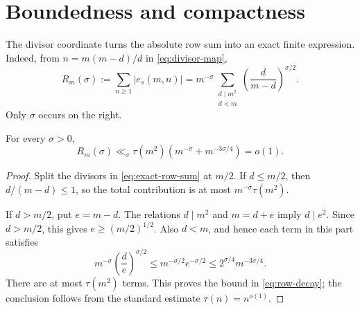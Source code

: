 \section{Boundedness and compactness}
\label{sec:bounded-compact}

The divisor coordinate turns the absolute row sum into an exact finite
expression.  Indeed, from
$n=m(m-d)/d$ in \eqref{eq:divisor-map},
\begin{equation}
 R_m(\sigma):=\sum_{n\geq1}|e_s(m,n)|
 =m^{-\sigma}
  \sum_{\substack{d\mid m^2\\d<m}}
  (\frac{d}{m-d})^{\sigma/2}.
 \label{eq:exact-row-sum}
\end{equation}
Only $\sigma$ occurs on the right.

\begin{proposition}
\label{prop:vanishing-rows}
For every $\sigma>0$,
\begin{equation}
 R_m(\sigma)
 \ll_\sigma \tau(m^2)
 (m^{-\sigma}+m^{-3\sigma/4})=o(1).
 \label{eq:row-decay}
\end{equation}
\end{proposition}

\begin{proof}
Split the divisors in \eqref{eq:exact-row-sum} at $m/2$.  If $d\leq m/2$,
then $d/(m-d)\leq1$, so the total contribution is at most
$m^{-\sigma}\tau(m^2)$.

If $d>m/2$, put $e=m-d$.  The relations $d\mid m^2$ and $m=d+e$ imply
$d\mid e^2$.  Since $d>m/2$, this gives
$e\geq(m/2)^{1/2}$.  Also $d<m$, and hence each term in this part satisfies
\[
 m^{-\sigma}(\frac d e)^{\sigma/2}
 \leq m^{-\sigma/2}e^{-\sigma/2}
 \leq 2^{\sigma/4}m^{-3\sigma/4}.
\]
There are at most $\tau(m^2)$ terms.  This proves the bound in
\eqref{eq:row-decay}; the conclusion follows from the standard estimate
$\tau(n)=n^{o(1)}$.
\end{proof}

